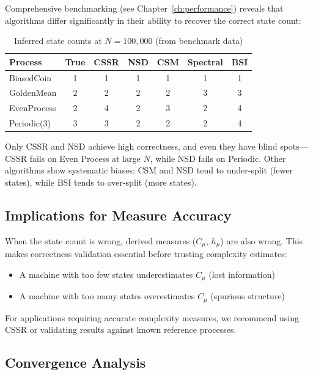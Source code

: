 \documentclass[11pt,a4paper]{report}
\theoremstyle{definition}
\theoremstyle{plain}
\newcommand{\Cmu}{C_\mu}
\newcommand{\hmu}{h_\mu}
\begin{document}
Comprehensive benchmarking (see Chapter~\ref{ch:performance}) reveals that algorithms differ significantly in their ability to recover the correct state count:

\begin{table}[h]
\centering
\caption{Inferred state counts at $N = 100{,}000$ (from benchmark data)}
\label{tab:state-counts}
\begin{tabular}{lcccccc}
\toprule
Process & True & CSSR & NSD & CSM & Spectral & BSI \\
\midrule
BiasedCoin & 1 & 1 & 1 & 1 & 1 & 1 \\
GoldenMean & 2 & 2 & 2 & 2 & 3 & 3 \\
EvenProcess & 2 & 4 & 2 & 3 & 2 & 4 \\
Periodic(3) & 3 & 3 & 2 & 2 & 2 & 4 \\
\bottomrule
\end{tabular}
\end{table}

Only CSSR and NSD achieve high correctness, and even they have blind spots---CSSR fails on Even Process at large $N$, while NSD fails on Periodic. Other algorithms show systematic biases: CSM and NSD tend to under-split (fewer states), while BSI tends to over-split (more states).

\subsection{Implications for Measure Accuracy}

When the state count is wrong, derived measures ($\Cmu$, $\hmu$) are also wrong. This makes correctness validation essential before trusting complexity estimates:

\begin{itemize}
    \item A machine with too few states underestimates $\Cmu$ (lost information)
    \item A machine with too many states overestimates $\Cmu$ (spurious structure)
\end{itemize}

For applications requiring accurate complexity measures, we recommend using CSSR or validating results against known reference processes.

\subsection{Convergence Analysis}
\end{document}
